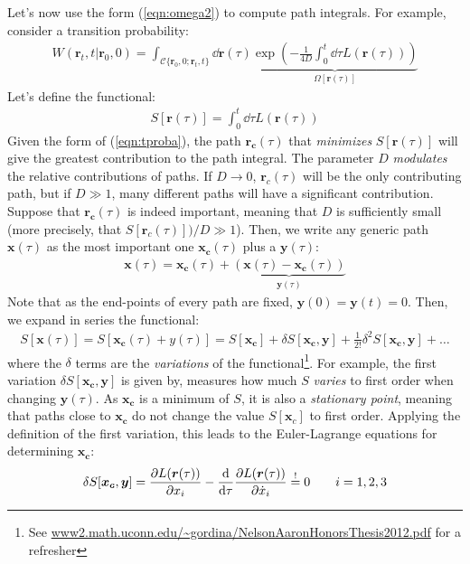 \documentclass[../template.tex]{subfiles}
\begin{document}
Let's now use the form (\ref{eqn:omega2}) to compute path integrals. For example,
 consider a transition probability:
\begin{align}\label{eqn:tproba}
    W(\bm{r}_t, t|\bm{r}_0, 0) = \int_{\mathcal{C}\{\bm{r}_0,0;\bm{r}_t,t\}} \dd{\bm{r}(\tau)} \underbrace{\exp\left(-\frac{1}{4D} \int_0^t \dd{\tau} L(\bm{r}(\tau)) \right) }_{\Omega[\bm{r}(\tau)]}
\end{align}
Let's define the functional:
\begin{align*}
    S[\bm{r}(\tau)] = \int_0^t \dd{\tau} L(\bm{r}(\tau))
\end{align*}
Given the form of (\ref{eqn:tproba}), the path $\bm{r_c}(\tau)$ that \textit{minimizes} $S[\bm{r}(\tau)]$ will give the greatest contribution to the path integral. The parameter $D$ \textit{modulates} the relative contributions of paths. If $D \to 0$, $\bm{r}_c(\tau)$ will be the only contributing path, but if $D \gg 1$, many different paths will have a significant contribution. Suppose that $\bm{r_c}(\tau)$ is indeed important, meaning that $D$ is sufficiently small (more precisely, that $S[\bm{r}_c(\tau)])/D \gg 1$). Then, we write any generic path $\bm{x}(\tau)$ as the most important one $\bm{x_c}(\tau)$ plus a  $\bm{y}(\tau)$:
\begin{align*}
    \bm{x}(\tau) = \bm{x_c}(\tau) + \underbrace{(\bm{x}(\tau) - \bm{x_c}(\tau))}_{\bm{y}(\tau)} 
\end{align*}
Note that as the end-points of every path are fixed, $\bm{y}(0) = \bm{y}(t) = 0$. Then, we expand in series the functional:
\begin{align*}
    S[\bm{x}(\tau)] = S[\bm{x_c}(\tau) + y(\tau)] = S[\bm{x_c}] + \delta S[\bm{x_c}, \bm{y}] + \frac{1}{2!} \delta^2 S[\bm{x_c},\bm{y}] + \dots 
\end{align*}
where the $\delta$ terms are the \textit{variations} of the functional\footnote{See \url{www2.math.uconn.edu/~gordina/NelsonAaronHonorsThesis2012.pdf} for a refresher}. For example, the first variation $\delta S[\bm{x_c}, \bm{y}]$ is given by, measures how much $S$ \textit{varies} to first order when changing $\bm{y}(\tau)$. As $\bm{x_c}$ is a minimum of $S$, it is also a \textit{stationary point}, meaning that paths close to $\bm{x_c}$ do not change the value $S[\bm{x}_c]$ to first order. Applying the definition of the first variation, this leads to the Euler-Lagrange equations for determining $\bm{x_c}$:
\begin{align*}
    \delta S[\bm{x_c}, \bm{y}] = \pdv{L(\bm{r}(\tau))}{x_i} - \dv{\tau} \pdv{L(\bm{r}(\tau))}{\dot{x}_i} \overset{!}{=}  0 \qquad i=1,2,3
\end{align*}
\end{document}
